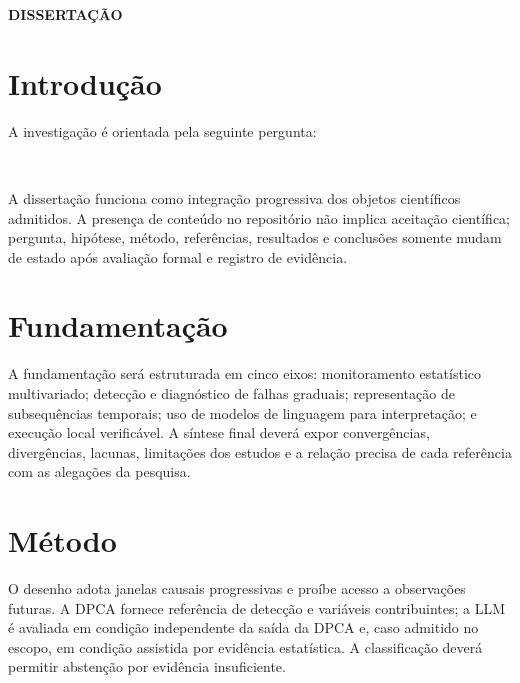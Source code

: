 \documentclass[a4paper,12pt]{abntex2}
\begin{document}
\begin{titlingpage}\centering
{\bfseries\Large DISSERTAÇÃO\par}\vspace{3cm}
{\Large \ResearchTitlePT\par}\vfill
\researchauthor\par\researchinstitution\par\researchyear
\end{titlingpage}
\tableofcontents\newpage

\chapter{Introdução}
\ResearchProblemPT

A investigação é orientada pela seguinte pergunta:

\begin{quote}
\ResearchQuestionPT
\end{quote}

\ResearchObjectivePT\ \ResearchContributionPT

A dissertação funciona como integração progressiva dos objetos científicos admitidos. A presença de conteúdo no repositório não implica aceitação científica; pergunta, hipótese, método, referências, resultados e conclusões somente mudam de estado após avaliação formal e registro de evidência.

\chapter{Fundamentação}
\LiteratureStatusPT

A fundamentação será estruturada em cinco eixos: monitoramento estatístico multivariado; detecção e diagnóstico de falhas graduais; representação de subsequências temporais; uso de modelos de linguagem para interpretação; e execução local verificável. A síntese final deverá expor convergências, divergências, lacunas, limitações dos estudos e a relação precisa de cada referência com as alegações da pesquisa.

\chapter{Método}
\ResearchMethodPT

O desenho adota janelas causais progressivas e proíbe acesso a observações futuras. A DPCA fornece referência de detecção e variáveis contribuintes; a LLM é avaliada em condição independente da saída da DPCA e, caso admitido no escopo, em condição assistida por evidência estatística. A classificação deverá permitir abstenção por evidência insuficiente.
\end{document}
